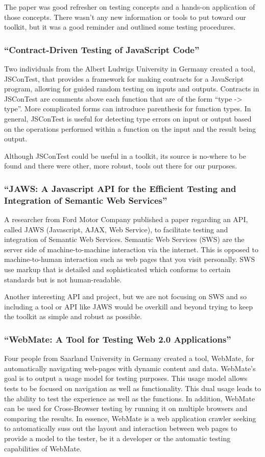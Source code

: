 \documentclass[11pt]{article}
\begin{document}
The paper was good refresher on testing concepts and a hands-on application of those concepts. There wasn't any new information or tools to put toward our toolkit, but it was a good reminder and outlined some testing procedures.

\subsubsection{``Contract-Driven Testing of JavaScript Code'' \cite{ContractDrivenTesting}}
Two individuals from the Albert Ludwigs University in Germany created a tool, JSConTest, that provides a framework for making contracts for a JavaScript program, allowing for guided random testing on inputs and outputs. Contracts in JSConTest are comments above each function that are of the form ``type -> type''. More complicated forms can introduce parenthesis for function types. In general, JSConTest is useful for detecting type errors on input or output based on the operations performed within a function on the input and the result being output. 

Although JSConTest could be useful in a toolkit, its source is no-where to be found and there were other, more robust, tools out there for our purposes.

\subsubsection{``JAWS: A Javascript API for the Efficient Testing and Integration of Semantic Web Services'' \cite{JAWS}}
A researcher from Ford Motor Company published a paper regarding an API, called JAWS (Javascript, AJAX, Web Service), to facilitate testing and integration of Semantic Web Services. Semantic Web Services (SWS) are the server side of machine-to-machine interaction via the internet. This is opposed to machine-to-human interaction such as web pages that you visit personally. SWS use markup that is detailed and sophisticated which conforms to certain standards but is not human-readable.

Another interesting API and project, but we are not focusing on SWS and so including a tool or API like JAWS would be overkill and beyond trying to keep the toolkit as simple and robust as possible.

\subsubsection{``WebMate: A Tool for Testing Web 2.0 Applications'' \cite{WebMate}}
Four people from Saarland University in Germany created a tool, WebMate, for automatically navigating web-pages with dynamic content and data. WebMate's goal is to output a usage model for testing purposes. This usage model allows tests to be focused on navigation as well as functionality. This dual usage leads to the ability to test the experience as well as the functions. In addition, WebMate can be used for Cross-Browser testing by running it on multiple browsers and comparing the results. In essence, WebMate is a web application crawler seeking to automatically suss out the layout and interaction between web pages to provide a model to the tester, be it a developer or the automatic testing capabilities of WebMate.
\end{document}
